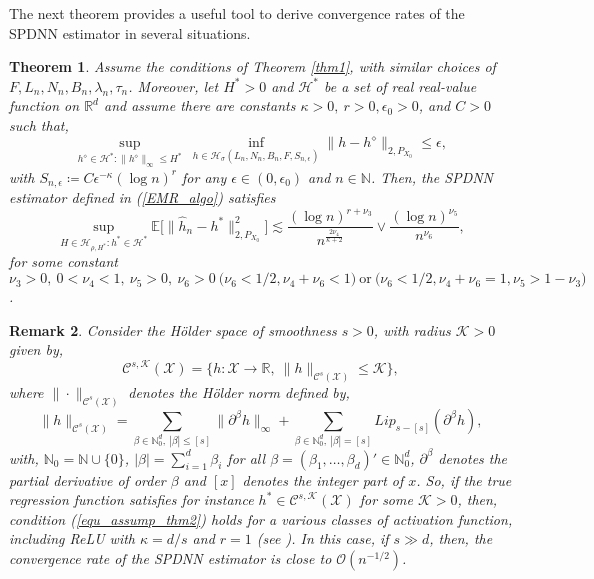 \documentclass[10pt,twoside]{article}
\numberwithin{equation}{section}
\newtheorem{thm}{Theorem}[section]
\newtheorem{rmrk}[thm]{Remark}
\newcommand{\E}{\ensuremath{\mathbb{E}}}
\newcommand{\R}{\ensuremath{\mathbb{R}}}
\newcommand{\N}{\ensuremath{\mathbb{N}}}
\begin{document}
 The next theorem provides a useful tool to derive convergence rates of the SPDNN estimator in several situations. 
%
\begin{thm}\label{thm2}
%
Assume the conditions of Theorem \ref{thm1}, with similar choices of $F, L_n, N_n, B_n, \lambda_n, \tau_n$.
Moreover, let $H^ {*} > 0$  and $\mathcal{H}^ {*} $ be a set of real real-value function on $ \R^d$ and assume there are constants $\kappa > 0, ~ r > 0, \epsilon_0 > 0$, and $C > 0$ such that, 
%
\begin{equation}\label{equ_assump_thm2}
\underset{ h^ {\diamond} \in \mathcal{H}^ {*}: \|h^ {\diamond} \|_ {\infty} \leq H^ {*} }{\sup} ~ \underset{ h \in  \mathcal{H}_ {\sigma} (L_n, N_n, B_n, F, S_ {n, \epsilon})}{\inf} \|h - h^ {\diamond} \|_{2, P_{X_0}} \leq \epsilon,
\end{equation}
%
with $S_ {n, \epsilon} \coloneqq C \epsilon^ {-\kappa} (\log n) ^r$ for any $\epsilon \in  (0, \epsilon_0) $ and $ n\in  \N$. Then, the SPDNN estimator defined in (\ref{EMR_algo})  satisfies
%
\begin{equation}\label{EMR_bound}
\underset{H\in \mathcal{H}_ {\rho, H^ {*}}: h^ {*} \in \mathcal{H}^ {*}} {\sup}  \E \Big[ \| \widehat{h}_n - h^ {*} \|_{2, P_{X_0}}^2 \Big] \lesssim \dfrac{ (\log n) ^{r + \nu_3}}{n^{ \frac{2 \nu_4}{\kappa + 2}} }  \lor \dfrac{(\log n) ^{\nu_5}}{n^ {\nu_6}},
\end{equation}
%
for some constant $\nu_3 > 0, ~ 0< \nu_4 < 1, ~ \nu_5 > 0, ~ \nu_6 > 0 ~ \Big( \nu_6 < 1/2, \nu_4 + \nu_6 < 1  \Big) ~ \text{or} ~\Big( \nu_6 < 1/2, \nu_4 + \nu_6 = 1, \nu_5 > 1-\nu_3 \Big) $.
\end{thm}
%

\begin{rmrk}\label{remark_rg}
 Consider the H{\"o}lder space of smoothness $s>0$, with radius $\mathcal{K}>0$ given by,
\begin{equation*}
 \mathcal{C}^{s,\mathcal{K}}( \mathcal{X} ) = \big\{h : \mathcal{X} \rightarrow \R,  ~  \| h\|_{\mathcal{C}^s(\mathcal{X} )} \leq  \mathcal{K} \big\},
\end{equation*}
%
where  $ \|  \cdot \|_{\mathcal{C}^s(\mathcal{X} )} $ denotes the H{\"o}lder norm defined by,
%
\[ \|h \|_{\mathcal{C}^s(\mathcal{X})} = \sum_{\beta \in \N_0^d, ~ |\beta| \leq [s]} \| \partial^\beta h \|_\infty + \sum_{\beta \in \N_0^d, ~ |\beta| = [s]} Lip_{s-[s]}(\partial^\beta h), \]
%
with, $\N_0 = \N \cup \{0\}$, $|\beta| = \sum_{i=1}^d \beta_i$ for all $\beta=(\beta_1,\ldots,\beta_d)' \in \N_0^d$, $\partial^\beta$ denotes the partial derivative of order $\beta$ and $[x]$ denotes the integer part of $x$.
%
So, if the true regression function satisfies for instance $h^* \in  \mathcal{C}^{s,\mathcal{K}}( \mathcal{X} )$ for some $\mathcal{K} >0$, then, condition (\ref{equ_assump_thm2}) holds for a  various classes of activation function, including ReLU with $\kappa=d/s$ and $r=1$ (see \cite{kengne2023deep}). In this case, if $s\gg d$, then, the convergence rate of the SPDNN estimator is close to $\mathcal{O}(n^{-1/2})$. 
\end{rmrk}
\end{document}
